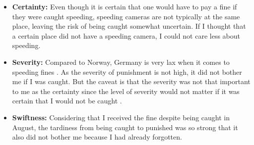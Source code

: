\documentclass[12pt]{article}
\begin{document}
\begin{itemize}
    \item \textbf{Certainty:} Even though it is certain that one would have to pay a fine if they were caught speeding, speeding cameras are not typically at the same place, leaving the risk of being caught somewhat uncertain. If I thought that a certain place did not have a speeding camera, I could not care less about speeding.
    \item \textbf{Severity:} Compared to Norway, Germany is very lax when it comes to speeding fines \cite{speeding}. As the severity of punishment is not high, it did not bother me if I was caught. But the caveat is that the severity was not that important to me as the certainty since the level of severity would not matter if it was certain that I would not be caught \cite{engel2015afraid}. 
    \item \textbf{Swiftness:} Considering that I received the fine despite being caught in August, the tardiness from being caught to punished was so strong that it also did not bother me because I had already forgotten.
\end{itemize}



\end{document}
